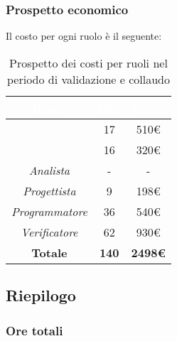 \subsubsection{Prospetto economico}
Il costo per ogni ruolo è il seguente:
\begin{table}[H]
	\begin{center}
		\begin{tabular}{ |c c c| }
		\rowcolor{darkblue} 
		\textcolor{white}{\textbf{Ruolo}} & \textcolor{white}{\textbf{Ore}} & \textcolor{white}{\textbf{Costo}} \\ \hline
		\textit{\Responsabile} 	& 17 	& 510€ \\ \hline
		\textit{\Amministratore} 	& 16 	& 320€ \\ \hline
		\textit{Analista} 		& - 	& - \\ \hline
		\textit{Progettista} 	& 9 	& 198€ \\ \hline
		\textit{Programmatore}  	& 36 	& 540€ \\ \hline
		\textit{Verificatore} 	& 62 	& 930€ \\ \hline
		\textbf{Totale} & \textbf{140} & \textbf{2498€} \\ \hline
		\end{tabular}
	\caption{ Prospetto dei costi per ruoli nel periodo di validazione e collaudo}
	\end{center}
\end{table}

\subsection{Riepilogo}
\subsubsection{Ore totali}
